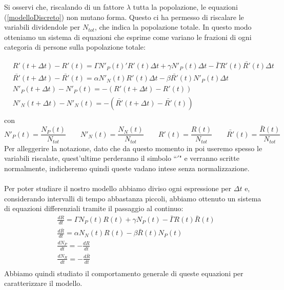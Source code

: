 Si osservi che, riscalando di un fattore $\lambda$ tutta la popolazione, le equazioni (\ref{modelloDiscreto}) non mutano forma. Questo ci ha permesso di riscalare le variabili dividendole per $ N_{tot}$, che indica la popolazione totale. In questo modo otteniamo un sistema di equazioni che esprime come variano le frazioni di ogni categoria di persone sulla popolazione totale:  

\begin{equation} \label{eq: 1.3}
	\begin{aligned}
		&R'(t+\Delta t)-R'(t)=\Gamma N'_P(t)'R'(t)\Delta t+\gamma N'_P(t)\Delta t-\bar{\Gamma}R'(t)\bar{R'}(t)\Delta t\\
	&\bar{R'}(t+\Delta t)-\bar{R'}(t)=\alpha N'_N(t)R'(t)\Delta t-\beta \bar{R'}(t)N'_P(t)\Delta t\\
	&N'_P(t+\Delta t)-N'_P(t)=-(R'(t+\Delta t)-R'(t))\\
	&N'_N(t+\Delta t)-N'_N(t)=-(\bar{R'}(t+\Delta t)-\bar{R'}(t))\\
	\end{aligned}
\end{equation}	
con 
\begin{equation*}
	N'_{P}(t)=\frac{N_{P}(t)}{N_{tot}} \qquad 	N'_{N}(t)=\frac{N_{N}(t)}{N_{tot}} \qquad	R'(t)=\frac{R(t)}{N_{tot}} \qquad	\bar{R'}(t)=\frac{\bar{R}(t)}{N_{tot}} 
\end{equation*}
Per alleggerire la notazione, dato che da questo momento in poi useremo spesso le variabili riscalate, quest'ultime perderanno il simbolo ``$ ' $" e verranno scritte normalmente, indicheremo quindi queste vadano intese senza normalizzazione. \\
%
\\
Per poter studiare il nostro modello abbiamo diviso ogni espressione per $ \Delta t $ e, considerando intervalli di tempo abbastanza piccoli, abbiamo ottenuto un sistema di equazioni differenziali tramite il passaggio al continuo:
\begin{equation} \label{eq:1.4}
		\begin{aligned}
			&\frac{dR}{dt}=\Gamma N_P(t) R(t)+\gamma N_P(t)-\bar{\Gamma}R(t)\bar{R}(t)\\
		&\frac{d\bar{R}}{dt}=\alpha N_N(t)R(t)-\beta \bar{R}(t)N_P(t)\\
		&\frac{dN_{P}}{dt}= -\frac{dR}{dt}\\
		&\frac{dN_{R}}{dt}= -\frac{d\bar{R}}{dt}\\
		\end{aligned}
\end{equation}
Abbiamo quindi studiato il comportamento generale di queste equazioni per caratterizzare il modello.
